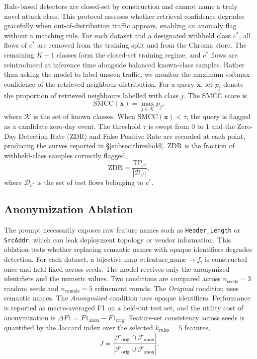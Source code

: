 Rule-based detectors are closed-set by construction and cannot name a truly
novel attack class. This protocol assesses whether retrieval confidence
degrades gracefully when out-of-distribution traffic appears, enabling an
anomaly flag without a matching rule. For each dataset and a designated
withheld class $c^{*}$, all flows of $c^{*}$ are removed from the training
split and from the Chroma store. The remaining $K-1$ classes form the
closed-set training regime, and $c^{*}$ flows are reintroduced at inference
time alongside balanced known-class samples. Rather than asking the model to
label unseen traffic, we monitor the maximum softmax confidence of the
retrieved neighbour distribution. For a query $\mathbf{x}$, let $p_j$ denote
the proportion of retrieved neighbours labelled with class $j$. The SMCC
score is
\[
  \mathrm{SMCC}(\mathbf{x}) = \max_{j \in \mathcal{K}} p_j ,
\]
where $\mathcal{K}$ is the set of known classes. When
$\mathrm{SMCC}(\mathbf{x}) < \tau$, the query is flagged as a candidate
zero-day event. The threshold $\tau$ is swept from $0$ to $1$ and the
Zero-Day Detection Rate (ZDR) and False Positive Rate are recorded at each
point, producing the curves reported in \S\ref{subsec:threshold}. ZDR is the
fraction of withheld-class samples correctly flagged,
\[
  \mathrm{ZDR} = \frac{\mathrm{TP}_{c^{*}}}{\left| \mathcal{D}_{c^{*}} \right|} ,
\]
where $\mathcal{D}_{c^{*}}$ is the set of test flows belonging to $c^{*}$.

\subsection{Anonymization Ablation}
\label{subsec:anon}

The prompt necessarily exposes raw feature names such as
\texttt{Header\_Length} or \texttt{SrcAddr}, which can leak deployment topology
or vendor information. This ablation tests whether replacing semantic names
with opaque identifiers degrades detection. For each dataset, a bijective map
$\sigma: \text{feature\_name} \to f_i$ is constructed once and held fixed
across seeds. The model receives only the anonymized identifiers and the
numeric values. Two conditions are compared across $n_{\text{seeds}}=3$ random
seeds and $n_{\text{rounds}}=5$ refinement rounds. The \emph{Original}
condition uses semantic names. The \emph{Anonymized} condition uses opaque
identifiers. Performance is reported as macro-averaged F1 on a held-out test
set, and the utility cost of anonymization is
$\Delta F1 = \overline{F1}_{\text{anon}} - \overline{F1}_{\text{orig}}$.
Feature-set consistency across seeds is quantified by the Jaccard index over
the selected $k_{\text{rules}}=5$ features,
\[
  J = \frac{\left| \mathcal{F}_{\text{orig}} \cap \mathcal{F}_{\text{anon}} \right|}
           {\left| \mathcal{F}_{\text{orig}} \cup \mathcal{F}_{\text{anon}} \right|} .
\]


